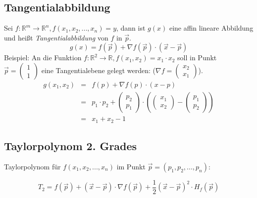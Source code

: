 \subsection{Tangentialabbildung} %
\label{sub:tangentialabbildung}
Sei $f : \mathbb{R}^m \rightarrow \mathbb{R}^n, f(x_1,x_2,...,x_n) = y$, dann ist $g(x)$ eine affin lineare Abbildung und heißt
\emph{Tangentialabbildung} von $f$ in $\overrightarrow{p}$.
\begin{equation}
	g(x) = f(\overrightarrow{p}) + \nabla f(\overrightarrow{p})\cdot(\overrightarrow{x}-\overrightarrow{p})
\end{equation}
Beispiel: An die Funktion $f : \mathbb{R}^2 \rightarrow \mathbb{R}, f(x_1,x_2) = x_1 \cdot x_2$ soll in Punkt $\overrightarrow{p} = 
\left(\begin{array}{c}1\\1\end{array}\right)$ eine Tangentialebene gelegt werden:
($\nabla f = \left(\begin{array}{c}x_2\\x_1\end{array}\right)$). 
\begin{eqnarray*}
	g(x_1,x_2) &=& f(p) + \nabla f(p) \cdot (x-p) \\
	&=& p_1\cdot p_2 + \left(\begin{array}{c}p_2\\p_1\end{array}\right) \cdot
	 \left(\left(\begin{array}{c}x_1\\x_2\end{array}\right) - \left(\begin{array}{c}p_1\\p_2\end{array}\right) \right) \\
	&=& x_1 + x_2 -1
\end{eqnarray*}

\subsection{Taylorpolynom 2. Grades} %
\label{sub:taylorpolynom_2_grades}

Taylorpolynom für $f(x_1,x_2,...,x_n)$ im Punkt $\overrightarrow{p} = (p_1,p_2,...,p_n)$:

\begin{equation}
	T_2 = f(\overrightarrow{p}) + (\overrightarrow{x}-\overrightarrow{p}) \cdot \nabla f(\overrightarrow{p})+\frac{1}{2}
	(\overrightarrow{x}-\overrightarrow{p})^2 \cdot H_f(\overrightarrow{p})
\end{equation}


